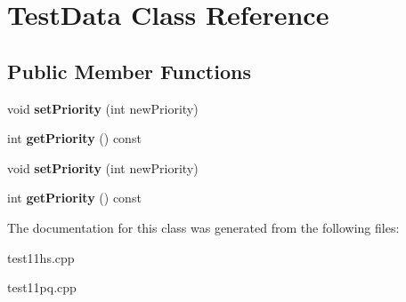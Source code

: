 \hypertarget{class_test_data}{\section{Test\+Data Class Reference}
\label{class_test_data}
}
\subsection*{Public Member Functions}
\begin{DoxyCompactItemize}
\item 
\hypertarget{class_test_data_af6c76355a3ab75cd07ca6bba7dfe2115}{void {\bfseries set\+Priority} (int new\+Priority)}\label{class_test_data_af6c76355a3ab75cd07ca6bba7dfe2115}

\item 
\hypertarget{class_test_data_a11f3f060f167d1989c94bf94860aed20}{int {\bfseries get\+Priority} () const }\label{class_test_data_a11f3f060f167d1989c94bf94860aed20}

\item 
\hypertarget{class_test_data_af6c76355a3ab75cd07ca6bba7dfe2115}{void {\bfseries set\+Priority} (int new\+Priority)}\label{class_test_data_af6c76355a3ab75cd07ca6bba7dfe2115}

\item 
\hypertarget{class_test_data_a11f3f060f167d1989c94bf94860aed20}{int {\bfseries get\+Priority} () const }\label{class_test_data_a11f3f060f167d1989c94bf94860aed20}

\end{DoxyCompactItemize}


The documentation for this class was generated from the following files\+:\begin{DoxyCompactItemize}
\item 
test11hs.\+cpp\item 
test11pq.\+cpp\end{DoxyCompactItemize}

